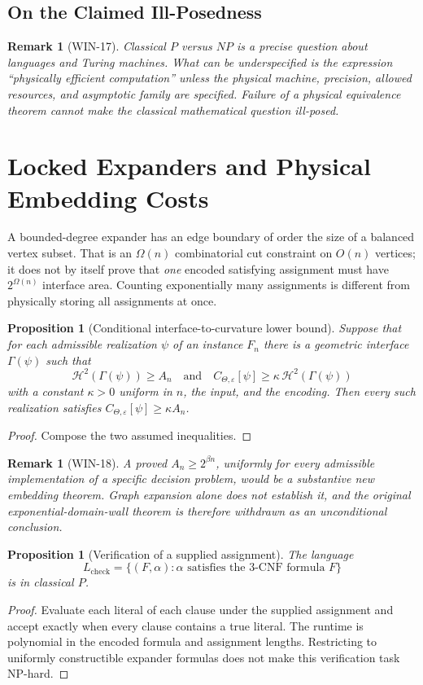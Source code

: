 \documentclass[11pt,a4paper]{article}
\newtheorem{proposition}[theorem]{Proposition}
\newtheorem{remark}[theorem]{Remark}
\newcommand{\CTheta}{C_{\Theta,\varepsilon}}
\begin{document}
\subsection{On the Claimed Ill-Posedness}
\begin{remark}[WIN-17]
Classical $P$ versus $NP$ is a precise question about languages and
Turing machines. What can be \emph{underspecified} is the expression
``physically efficient computation'' unless the physical machine,
precision, allowed resources, and asymptotic family are specified.
Failure of a physical equivalence theorem cannot make the classical
mathematical question ill-posed.
\end{remark}

\section{Locked Expanders and Physical Embedding Costs}
\label{sec:locked}
A bounded-degree expander has an edge boundary of order the size of a
balanced vertex subset. That is an $\Omega(n)$ combinatorial cut
constraint on $O(n)$ vertices; it does not by itself prove that \emph{one}
encoded satisfying assignment must have $2^{\Omega(n)}$ interface area.
Counting exponentially many assignments is different from physically
storing all assignments at once.

\begin{proposition}[Conditional interface-to-curvature lower bound]
\label{prop:interface}
Suppose that for each admissible realization $\psi$ of an instance $F_n$
there is a geometric interface $\Gamma(\psi)$ such that
\[
\mathcal H^2(\Gamma(\psi))\ge A_n
\quad\text{and}\quad
\CTheta[\psi]\ge\kappa\,\mathcal H^2(\Gamma(\psi))
\]
with a constant $\kappa>0$ uniform in $n$, the input, and the encoding.
Then every such realization satisfies $\CTheta[\psi]\ge\kappa A_n$.
\end{proposition}
\begin{proof}
Compose the two assumed inequalities.
\end{proof}
\begin{remark}[WIN-18]
A proved $A_n\ge 2^{\beta n}$, uniformly for every admissible
implementation of a specific \emph{decision problem}, would be a
substantive new embedding theorem. Graph expansion alone does not
establish it, and the original exponential-domain-wall theorem is
therefore withdrawn as an unconditional conclusion.
\end{remark}

\begin{proposition}[Verification of a supplied assignment]
\label{prop:assignment-P}
The language
\[
L_{\mathrm{check}}=\{(F,\alpha):\alpha\text{ satisfies the 3-CNF formula }F\}
\]
is in classical $P$.
\end{proposition}
\begin{proof}
Evaluate each literal of each clause under the supplied assignment and
accept exactly when every clause contains a true literal. The runtime is
polynomial in the encoded formula and assignment lengths. Restricting to
uniformly constructible expander formulas does not make this
verification task NP-hard.
\end{proof}
\end{document}
